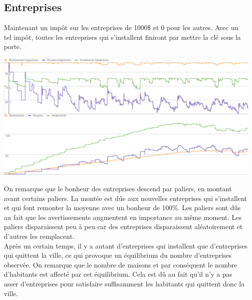\documentclass[11pt]{report}
\begin{document}
\subsection{Entreprises}
Maintenant un impôt sur les entreprises de 1000\$ et 0 pour les autres. Avec un tel impôt, toutes les entreprises qui s'installent finiront par mettre la clé sous la porte.
\begin{center}
	\includegraphics[width=\textwidth]{businesses_taxes}
\end{center}
On remarque que le bonheur des entreprises descend par paliers, en montant avant certains paliers. La montée est dûe aux nouvelles entreprises qui s'installent et qui font remonter la moyenne avec un bonheur de 100\%. Les paliers sont dûs au fait que les avertissements augmentent en importance au même moment. Les paliers disparaissent peu à peu car des entreprises disparaissent aléatoirement et d'autres les remplacent.\\
Après un certain temps, il y a autant d'entreprises qui installent que d'entreprises qui quittent la ville, ce qui provoque un équilibrium du nombre d'entreprises observée.
On remarque que le nombre de maisons et par conséquent le nombre d'habitants est affecté par cet équilibrium. Cela est dû au fait qu'il n'y a pas asser d'entreprises pour satisfaire suffisamment les habitants qui quittent donc la ville.

\newpage
\end{document}
